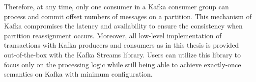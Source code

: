 Therefore, at any time, only one consumer in a Kafka consumer group can process and commit offset numbers of messages on a partition. This mechanism of Kafka compromises the latency and availability to ensure the consistency when partition reassignment occurs. Moreover, all low-level implementation of transactions with Kafka producers and consumers as in this thesis is provided out-of-the-box with the Kafka Streams library. Users can utilize this library to focus only on the processing logic while still being able to achieve exactly-once semantics on Kafka with minimum configuration.



